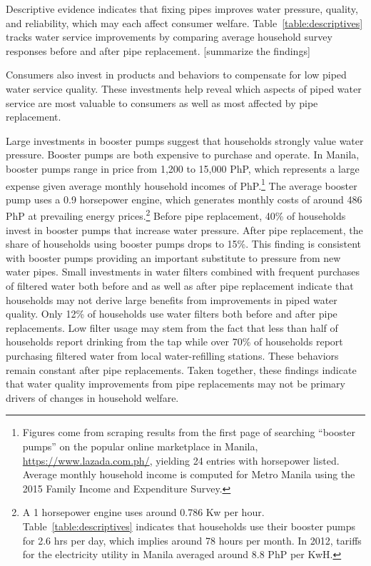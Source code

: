 \documentclass[12pt,table]{article}
\begin{document}
Descriptive evidence indicates that fixing pipes improves water pressure, quality, and reliability, which may each affect consumer welfare.  Table~\ref{table:descriptives} tracks water service improvements by comparing average household survey responses before and after pipe replacement.   [summarize the findings]

Consumers also invest in products and behaviors to compensate for low piped water service quality.  These investments help reveal which aspects of piped water service are most valuable to consumers as well as most affected by pipe replacement.  

Large investments in booster pumps suggest that households strongly value water pressure.  Booster pumps are both expensive to purchase and operate. In Manila, booster pumps range in price from 1,200 to 15,000 PhP, which represents a large expense given average monthly household incomes of PhP.\footnote{Figures come from scraping results from the first page of searching ``booster pumps'' on the popular online marketplace in Manila, \url{https://www.lazada.com.ph/},  yielding 24 entries with horsepower listed.  Average monthly household income is computed for Metro Manila using the 2015 Family Income and Expenditure Survey.}  The average booster pump uses a 0.9 horsepower engine, which generates monthly costs of around 486 PhP at prevailing energy prices.\footnote{A 1 horsepower engine uses around 0.786 Kw per hour.  Table~\ref{table:descriptives} indicates that households use their booster pumps for 2.6 hrs per day, which implies around 78 hours per month.  In 2012, tariffs for the electricity utility in Manila averaged around 8.8 PhP per KwH.}   Before pipe replacement, 40\% of households invest in booster pumps that increase water pressure.  After pipe replacement, the share of households using booster pumps drops to 15\%.  This finding is consistent with booster pumps providing an important substitute to pressure from new water pipes.
Small investments in water filters combined with frequent purchases of filtered water both before and as well as after pipe replacement indicate that households may not derive large benefits from improvements in piped water quality.  Only 12\% of households use water filters both before and after pipe replacements.  Low filter usage may stem from the fact that less than half of households report drinking from the tap while over 70\% of households report purchasing filtered water from local water-refilling stations.  These behaviors remain constant after pipe replacements.  Taken together, these findings indicate that water quality improvements from pipe replacements may not be primary drivers of changes in household welfare.
\end{document}
